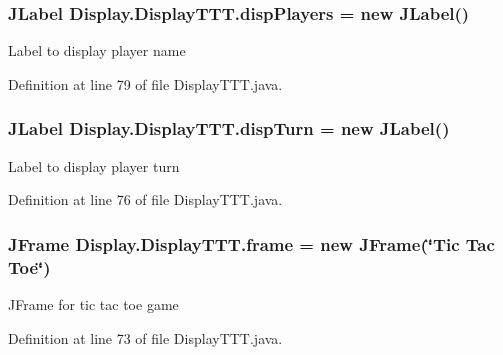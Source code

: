 \subsubsection[{disp\+Players}]{\setlength{\rightskip}{0pt plus 5cm}J\+Label Display.\+Display\+T\+T\+T.\+disp\+Players = new J\+Label()\hspace{0.3cm}{\ttfamily [private]}}\label{class_display_1_1_display_t_t_t_a2f2eeba39f4aa0dcc00ef6b72e2b6c66}
Label to display player name 

Definition at line 79 of file Display\+T\+T\+T.\+java.

\hypertarget{class_display_1_1_display_t_t_t_a22f3ef7e7b2123a2b900bc8511bdd474}{}
\subsubsection[{disp\+Turn}]{\setlength{\rightskip}{0pt plus 5cm}J\+Label Display.\+Display\+T\+T\+T.\+disp\+Turn = new J\+Label()\hspace{0.3cm}{\ttfamily [private]}}\label{class_display_1_1_display_t_t_t_a22f3ef7e7b2123a2b900bc8511bdd474}
Label to display player turn 

Definition at line 76 of file Display\+T\+T\+T.\+java.

\hypertarget{class_display_1_1_display_t_t_t_ab4d0cb92c4459675e8abd22f8ad4161f}{}
\subsubsection[{frame}]{\setlength{\rightskip}{0pt plus 5cm}J\+Frame Display.\+Display\+T\+T\+T.\+frame = new J\+Frame(\char`\"{}Tic Tac Toe\char`\"{})\hspace{0.3cm}{\ttfamily [private]}}\label{class_display_1_1_display_t_t_t_ab4d0cb92c4459675e8abd22f8ad4161f}
J\+Frame for tic tac toe game 

Definition at line 73 of file Display\+T\+T\+T.\+java.

\hypertarget{class_display_1_1_display_t_t_t_a2e4a57cf17355b6a63f5b9d4e9e74de4}{}
